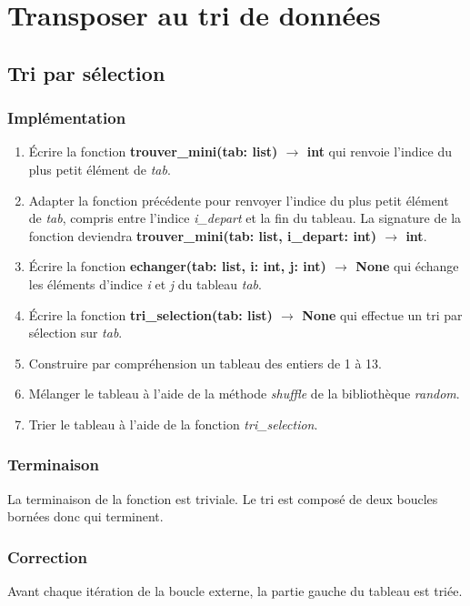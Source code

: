 \documentclass[a4paper,11pt]{article}
\begin{document}
\section{Transposer au tri de données}
\subsection{Tri par sélection}
\subsubsection{Implémentation}
\begin{activite}
\begin{enumerate}
    \item Écrire la fonction \textbf{trouver\_mini(tab: list) $\rightarrow$ int} qui renvoie l'indice du plus petit élément de \emph{tab}.
    \item Adapter la fonction précédente pour renvoyer l'indice du plus petit élément de \emph{tab}, compris entre l'indice \emph{i\_depart} et la fin du tableau. La signature de la fonction deviendra \textbf{trouver\_mini(tab: list, i\_depart: int) $\rightarrow$ int}.
    \item Écrire la fonction \textbf{echanger(tab: list, i: int, j: int) $\rightarrow$ None} qui échange les éléments d'indice \emph{i} et \emph{j} du tableau \emph{tab}.
    \item Écrire la fonction \textbf{tri\_selection(tab: list) $\rightarrow$ None} qui effectue un tri par sélection sur \emph{tab}.
    \item Construire par compréhension un tableau des entiers de 1 à 13.
    \item Mélanger le tableau à l'aide de la méthode \emph{shuffle} de la bibliothèque \emph{random}.
    \item Trier le tableau à l'aide de la fonction \emph{tri\_selection}.
\end{enumerate}
\end{activite}
\subsubsection{Terminaison}
La terminaison de la fonction est triviale. Le tri est composé de deux boucles bornées donc qui terminent.
\subsubsection{Correction}
Avant chaque itération de la boucle externe, la partie gauche du tableau est triée.
\end{document}
